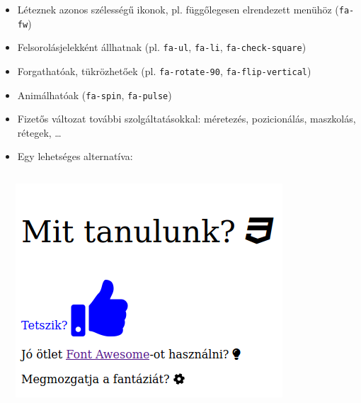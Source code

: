 %
\begin{frame}
  \begin{itemize}
    \item Léteznek azonos szélességű ikonok, pl. függőlegesen elrendezett menühöz (\texttt{fa-fw})
    \item Felsorolásjelekként állhatnak (pl. \texttt{fa-ul}, \texttt{fa-li}, \texttt{fa-check-square})
    \item Forgathatóak, tükrözhetőek (pl. \texttt{fa-rotate-90}, \texttt{fa-flip-vertical})
    \item Animálhatóak (\texttt{fa-spin}, \texttt{fa-pulse})
    \item Fizetős változat további szolgáltatásokkal: méretezés, pozicionálás, maszkolás, rétegek, \dots
    \item Egy lehetséges alternatíva: 
  \end{itemize}
\end{frame}

\begin{frame}
  \begin{columns}[c]
      \begin{exampleblock}{}
        \scriptsize
        
        
      \end{exampleblock}
      \includegraphics[width=\textwidth]{fontawesome.png}
  \end{columns}
\end{frame}

